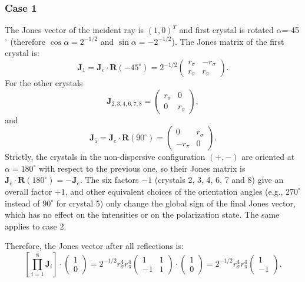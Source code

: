 \documentclass{iucr}
\begin{document}
\subsubsection{Case 1}
The Jones vector of the incident ray is $(1,0)^T$ and first crystal is rotated $\alpha$=-45$^\circ$ (therefore $\cos\alpha=2^{-1/2}$ and $\sin\alpha=-2^{-1/2}$). The Jones matrix of the first crystal is:
\begin{equation}\label{eq:Jcase1_xtal1_S4}
    \textbf{J}_1=\textbf{J}_e \cdot \textbf{R}(-45^{\circ})
    =
    2^{-1/2}
    \begin{pmatrix}
r_\sigma  &
-r_\sigma \\
r_\pi&
r_\pi
\end{pmatrix}.
\end{equation}
For the other crystals
\begin{equation}\label{eq:Jcase1_S4}
\textbf{J}_{2,3,4,6,7,8}=
    \begin{pmatrix}
r_\sigma & 0\\
0& 
r_\pi
\end{pmatrix},
\end{equation}
and
\begin{equation}\label{eq:J5case1_S4}
\textbf{J}_{5}=\textbf{J}_e\cdot \textbf{R}(90^{\circ})
=
\begin{pmatrix}
0 & r_\sigma\\
-r_\pi& 0
\end{pmatrix}.
\end{equation}
Strictly, the crystals in the non-dispersive configuration $(+,-)$ are oriented at $\alpha=180^\circ$ with respect to the previous one, so their Jones matrix is $\textbf{J}_e\cdot\textbf{R}(180^\circ)=-\textbf{J}_e$. The six factors $-1$ (crystals 2, 3, 4, 6, 7 and 8) give an overall factor $+1$, and other equivalent choices of the orientation angles (e.g., $270^\circ$ instead of $90^\circ$ for crystal 5) only change the global sign of the final Jones vector, which has no effect on the intensities or on the polarization state. The same applies to case 2.

Therefore, the Jones vector after all reflections is:
\begin{equation}\label{eq:JVcase1_S4}
\left[ \prod_{i=1}^{8} \textbf{J}_i \right]
    \cdot
    \begin{pmatrix}
    1\\0
    \end{pmatrix}=
    2^{-1/2} r_\sigma^4 r_\pi^4
        \begin{pmatrix}
   1&1\\
    -1 & 1
    \end{pmatrix}
    \cdot
        \begin{pmatrix}
    1\\0
    \end{pmatrix}
    =
    2^{-1/2}r_\sigma^4 r_\pi^4
    \begin{pmatrix}
    1\\
    -1
    \end{pmatrix}.
\end{equation}
\end{document}
